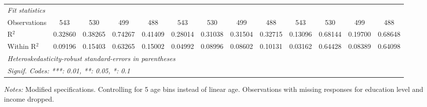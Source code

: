 \begin{tabular}{lcccccccccccc}
   \midrule
   \emph{Fit statistics}\\
   Observations                              & 543      & 530      & 499      & 488           & 543            & 530           & 499           & 488            & 543      & 530      & 499      & 488\\  
   R$^2$                                     & 0.32860  & 0.38265  & 0.74267  & 0.41409       & 0.28014        & 0.31038       & 0.31504       & 0.32715        & 0.13096  & 0.68144  & 0.19700  & 0.68648\\  
   Within R$^2$                              & 0.09196  & 0.15403  & 0.63265  & 0.15002       & 0.04992        & 0.08996       & 0.08602       & 0.10131        & 0.03162  & 0.64428  & 0.08389  & 0.64098\\  
   \midrule \midrule
   \multicolumn{13}{l}{\emph{Heteroskedasticity-robust standard-errors in parentheses}}\\
   \multicolumn{13}{l}{\emph{Signif. Codes: ***: 0.01, **: 0.05, *: 0.1}}\\
\end{tabular}
 
\par \raggedright 
\textit{Notes:} Modified specifications. Controlling for 5 age bins instead of linear age. Observations with missing responses for education level and income dropped.
\par\endgroup


